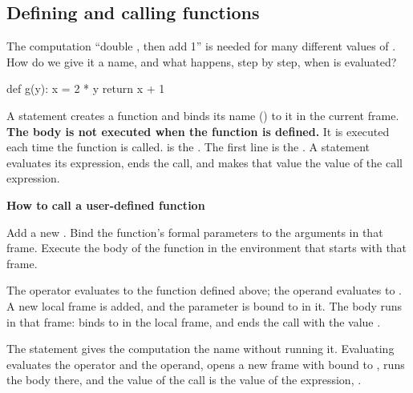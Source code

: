 \documentclass[10pt]{scrartcl}
\newenvironment{howto}[1]{\begin{mdframed}[style=howtostyle]{\color{NavyBlue}\textbf{#1}}\par\vspace{2pt}}{\end{mdframed}}
\begin{document}
\subsection{Defining and calling functions}

\begin{qbox}
  The computation ``double , then add 1'' is needed for many different values of . How do we give it a name, and what happens, step by step, when  is evaluated?
\end{qbox}
\begin{py}
def g(y):
    x = 2 * y
    return x + 1
\end{py}
\begin{itemize}
  \ii A  statement creates a function and binds its name () to it in the current frame. \textbf{The body is not executed when the function is defined.} It is executed each time the function is called.
  \ii {} is the . The first line  is the .
  \ii A  statement evaluates its expression, ends the call, and makes that value the value of the call expression.
\end{itemize}

\begin{howto}{How to call a user-defined function}
\begin{steps}
  \ii Add a new .
  \ii Bind the function's formal parameters to the arguments in that frame.
  \ii Execute the body of the function in the environment that starts with that frame.
\end{steps}
\end{howto}

\begin{example*}[Evaluating \cd{g(3)}]
\begin{steps}
  \ii The operator  evaluates to the function defined above; the operand  evaluates to .
  \ii A new local frame is added, and the parameter  is bound to  in it.
  \ii The body runs in that frame:  binds  to  in the local frame, and  ends the call with the value .
\end{steps}
\end{example*}

\revisit The  statement gives the computation the name  without running it. Evaluating  evaluates the operator and the operand, opens a new frame with  bound to , runs the body there, and the value of the call is the value of the  expression, .
\end{document}
